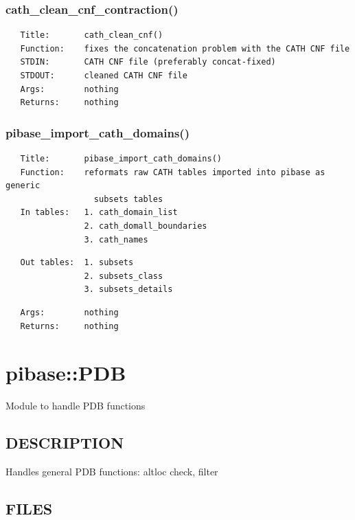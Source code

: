\documentclass{article}
\begin{document}
\subsubsection*{cath\_clean\_cnf\_contraction()\label{pibase::CATH_cath_clean_cnf_contraction_}}
\begin{verbatim}
   Title:       cath_clean_cnf()
   Function:    fixes the concatenation problem with the CATH CNF file
   STDIN:       CATH CNF file (preferably concat-fixed)
   STDOUT:      cleaned CATH CNF file
   Args:        nothing
   Returns:     nothing
\end{verbatim}
\subsubsection*{pibase\_import\_cath\_domains()\label{pibase::CATH_pibase_import_cath_domains_}}
\begin{verbatim}
   Title:       pibase_import_cath_domains()
   Function:    reformats raw CATH tables imported into pibase as generic
                  subsets tables
   In tables:   1. cath_domain_list
                2. cath_domall_boundaries
                3. cath_names
\end{verbatim}
\begin{verbatim}
   Out tables:  1. subsets
                2. subsets_class
                3. subsets_details
\end{verbatim}
\begin{verbatim}
   Args:        nothing
   Returns:     nothing
\end{verbatim}
\clearpage
\section{pibase::PDB\label{pibase::PDB}}


Module to handle PDB functions

\subsection*{DESCRIPTION\label{pibase::PDB_DESCRIPTION}}


Handles general PDB functions: altloc check, filter

\subsection*{FILES\label{pibase::PDB_FILES}}
\end{document}
